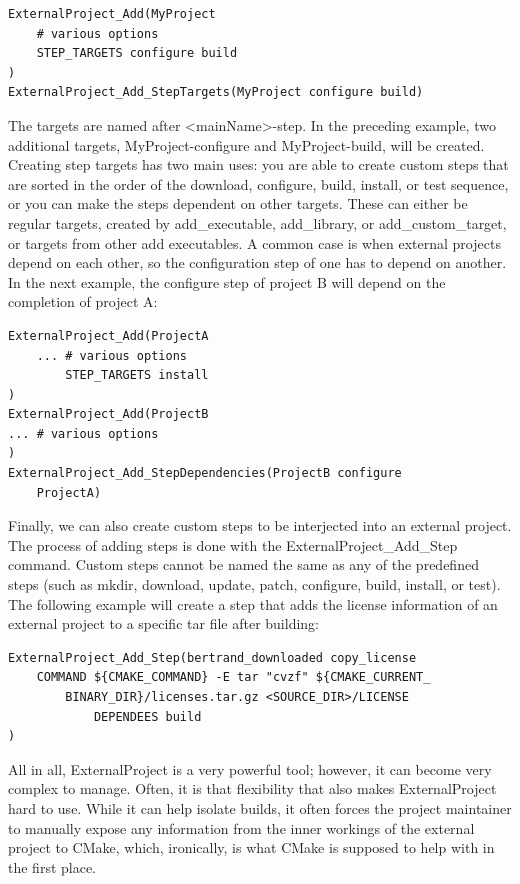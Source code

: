 \begin{lstlisting}[style=styleCMake]
ExternalProject_Add(MyProject
	# various options
	STEP_TARGETS configure build
)
ExternalProject_Add_StepTargets(MyProject configure build)
\end{lstlisting}

The targets are named after <mainName>-step. In the preceding example, two additional targets, MyProject-configure and MyProject-build, will be created. Creating step targets has two main uses: you are able to create custom steps that are sorted in the order of the download, configure, build, install, or test sequence, or you can make the steps dependent on other targets. These can either be regular targets, created by add\_executable, add\_library, or add\_custom\_target, or targets from other add executables. A common case is when external projects depend on each other, so the configuration step of one has to depend on another. In the next example, the configure step of project B will depend on the completion of project A:
 
\begin{lstlisting}[style=styleCMake]
ExternalProject_Add(ProjectA
	... # various options
		STEP_TARGETS install
)
ExternalProject_Add(ProjectB
... # various options
)
ExternalProject_Add_StepDependencies(ProjectB configure
	ProjectA)
\end{lstlisting}

Finally, we can also create custom steps to be interjected into an external project. The process of adding steps is done with the ExternalProject\_Add\_Step command. Custom steps cannot be named the same as any of the predefined steps (such as mkdir, download, update, patch, configure, build, install, or test). The following example will create a step that adds the license information of an external project to a specific tar file after building:

\begin{lstlisting}[style=styleCMake]
ExternalProject_Add_Step(bertrand_downloaded copy_license
	COMMAND ${CMAKE_COMMAND} -E tar "cvzf" ${CMAKE_CURRENT_
		BINARY_DIR}/licenses.tar.gz <SOURCE_DIR>/LICENSE
			DEPENDEES build
)
\end{lstlisting}

All in all, ExternalProject is a very powerful tool; however, it can become very complex to manage. Often, it is that flexibility that also makes ExternalProject hard to use. While it can help isolate builds, it often forces the project maintainer to manually expose any information from the inner workings of the external project to CMake, which, ironically, is what CMake is supposed to help with in the first place.











